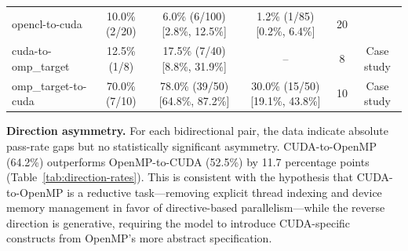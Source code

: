 \documentclass[conference]{IEEEtran}
\begin{document}
\begin{table}[t]
\begin{tabular}{@{}lccccc@{}}
opencl-to-cuda & 10.0\% (2/20) & 6.0\% (6/100) [2.8\%, 12.5\%] & 1.2\% (1/85) [0.2\%, 6.4\%] & 20 & \\ %
cuda-to-omp\_target & 12.5\% (1/8) & 17.5\% (7/40) [8.8\%, 31.9\%] & -- & 8 & Case study \\ %
omp\_target-to-cuda & 70.0\% (7/10) & 78.0\% (39/50) [64.8\%, 87.2\%] & 30.0\% (15/50) [19.1\%, 43.8\%] & 10 & Case study \\ %
\bottomrule
\end{tabular}
\end{table}

\textbf{Direction asymmetry.} For each bidirectional pair, the data indicate absolute pass-rate gaps but no statistically significant asymmetry. CUDA-to-OpenMP (64.2\%) outperforms OpenMP-to-CUDA (52.5\%) by 11.7 percentage points (Table~\ref{tab:direction-rates}). This is consistent with the hypothesis that CUDA-to-OpenMP is a reductive task---removing explicit thread indexing and device memory management in favor of directive-based parallelism---while the reverse direction is generative, requiring the model to introduce CUDA-specific constructs from OpenMP's more abstract specification.
\end{document}
